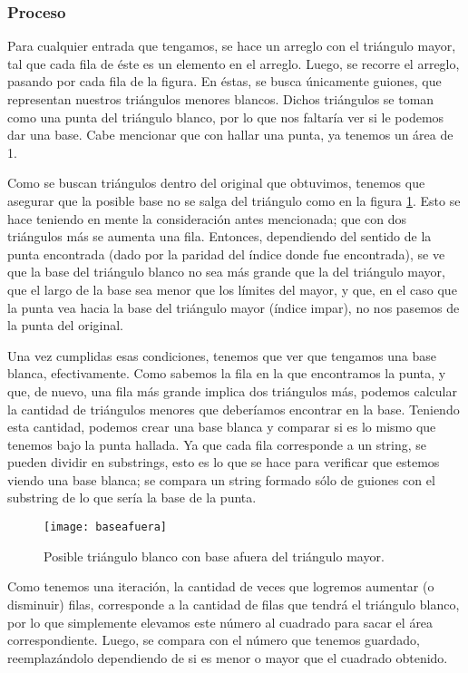 \documentclass[letterpaper]{article}
\begin{document}
\subsubsection{Proceso}
Para cualquier entrada que tengamos, se hace un arreglo con el tri\'angulo mayor,
tal que cada fila de \'este es un elemento en el arreglo. Luego, se recorre el
arreglo, pasando por cada fila de la figura. En \'estas, se busca \'unicamente guiones,
que representan nuestros tri\'angulos menores blancos. Dichos tri\'angulos se toman
como una punta del tri\'angulo blanco, por lo que nos faltar\'ia ver si le podemos
dar una base. Cabe mencionar que con hallar una punta, ya tenemos un \'area de 1.\par
Como se buscan tri\'angulos dentro del original que obtuvimos, tenemos que asegurar
que la posible base no se salga del tri\'angulo como en la figura \ref{fig:baseafuera}.
Esto se hace teniendo en mente la consideraci\'on antes mencionada; que con dos
tri\'angulos m\'as se aumenta una fila. Entonces, dependiendo del sentido de la
punta encontrada (dado por la paridad del \'indice donde fue encontrada), se ve
que la base del tri\'angulo blanco no sea m\'as grande que la del tri\'angulo
mayor, que el largo de la base sea menor que los l\'imites del mayor, y que, en
el caso que la punta vea hacia la base del tri\'angulo mayor (\'indice impar), no
nos pasemos de la punta del original.\par
Una vez cumplidas esas condiciones, tenemos que ver que tengamos una base blanca,
efectivamente. Como sabemos la fila en la que encontramos la punta, y que, de nuevo,
una fila m\'as grande implica dos tri\'angulos m\'as, podemos calcular la cantidad
de tri\'angulos menores que deber\'iamos encontrar en la base. Teniendo esta
cantidad, podemos crear una base blanca y comparar si es lo mismo que tenemos bajo
la punta hallada. Ya que cada fila corresponde a un string, se pueden dividir en
substrings, esto es lo que se hace para verificar que estemos viendo una base
blanca; se compara un string formado s\'olo de guiones con el substring de lo que
ser\'ia la base de la punta.
  \begin{figure}[t!]
    \centering
    \texttt{[image: baseafuera]}
    \caption{Posible tri\'angulo blanco con base afuera del tri\'angulo mayor.}
    \label{fig:baseafuera}
  \end{figure}
  \par Como tenemos una iteraci\'on, la cantidad de veces que logremos aumentar
  (o disminuir) filas, corresponde a la cantidad de filas que tendr\'a el
  tri\'angulo blanco, por lo que simplemente elevamos este n\'umero al cuadrado
  para sacar el \'area correspondiente. Luego, se compara con el n\'umero que
  tenemos guardado, reemplaz\'andolo dependiendo de si es menor o mayor que el
  cuadrado obtenido.
\end{document}
